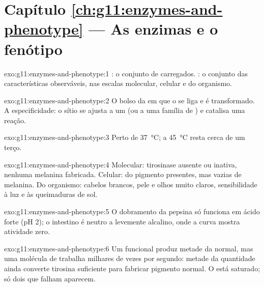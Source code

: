 \section*{Capítulo \ref{ch:g11:enzymes-and-phenotype} --- As enzimas e o fenótipo}

\begin{solution}{exo:g11:enzymes-and-phenotype:1}
: o conjunto de  carregados. : o conjunto das
características observáveis, nas escalas molecular, celular e do
organismo.
\end{solution}

\begin{solution}{exo:g11:enzymes-and-phenotype:2}
O bolso da  em que o  se liga e é transformado. A
especificidade: o sítio se ajusta a um  (ou a uma família de
) e catalisa uma reação.
\end{solution}

\begin{solution}{exo:g11:enzymes-and-phenotype:3}
Perto de \qty{37}{\celsius}; a \qty{45}{\celsius} resta cerca de um terço.
\end{solution}

\begin{solution}{exo:g11:enzymes-and-phenotype:4}
Molecular: tirosinase ausente ou inativa, nenhuma melanina fabricada.
Celular:  do pigmento presentes, mas vazias de melanina. Do
organismo: cabelos brancos, pele e olhos muito claros, sensibilidade à
luz e às queimaduras de sol.
\end{solution}

\begin{solution}{exo:g11:enzymes-and-phenotype:5}
O dobramento da pepsina só funciona em ácido forte (pH 2); o intestino
é neutro a levemente alcalino, onde a curva mostra atividade zero.
\end{solution}

\begin{solution}{exo:g11:enzymes-and-phenotype:6}
Um  funcional produz metade da  normal, mas uma molécula de
 trabalha milhares de vezes por segundo: metade da quantidade
ainda converte tirosina suficiente para fabricar pigmento normal. O
 está saturado; só dois  que falham aparecem.
\end{solution}

